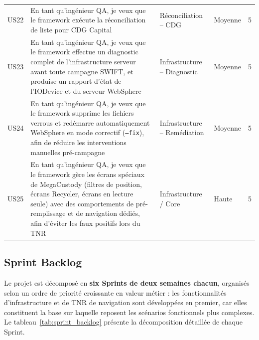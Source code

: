 \documentclass[12pt, a4paper]{report}
\begin{document}
\begin{longtable}{p{0.9cm} p{6.0cm} p{2.6cm} p{1.5cm} p{0.9cm}}
US22 & En tant qu'ingénieur QA, je veux que le framework exécute la réconciliation de liste pour CDG Capital
      & Réconciliation – CDG & Moyenne & 5 \\[4pt]

US23 & En tant qu'ingénieur QA, je veux que le framework effectue un diagnostic complet de l'infrastructure serveur avant toute campagne SWIFT, et produise un rapport d'état de l'IODevice et du serveur WebSphere
      & Infrastructure – Diagnostic & Moyenne & 5 \\[4pt]

US24 & En tant qu'ingénieur QA, je veux que le framework supprime les fichiers verrous et redémarre automatiquement WebSphere en mode correctif (\texttt{--fix}), afin de réduire les interventions manuelles pré-campagne
      & Infrastructure – Remédiation & Moyenne & 5 \\[4pt]

US25 & En tant qu'ingénieur QA, je veux que le framework gère les écrans spéciaux de MegaCustody (filtres de position, écrans Recycler, écrans en lecture seule) avec des comportements de pré-remplissage et de navigation dédiés, afin d'éviter les faux positifs lors du TNR
      & Infrastructure / Core & Haute & 5 \\

\end{longtable}

\subsection{Sprint Backlog}

Le projet est décomposé en \textbf{six Sprints de deux semaines chacun}, organisés selon un ordre de priorité croissante en valeur métier : les fonctionnalités d'infrastructure et de TNR de navigation sont développées en premier, car elles constituent la base sur laquelle reposent les scénarios fonctionnels plus complexes. Le tableau~\ref{tab:sprint_backlog} présente la décomposition détaillée de chaque Sprint.
\end{document}
